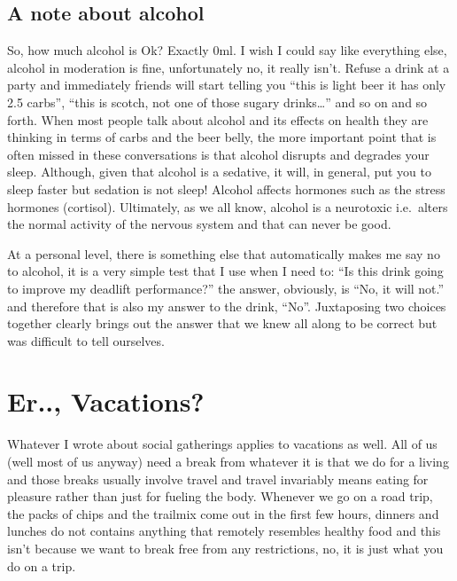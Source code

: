 \documentclass[
  oneside]{book}
\begin{document}
\hypertarget{a-note-about-alcohol}{%
\subsection{A note about alcohol}\label{a-note-about-alcohol}}

So, how much alcohol is Ok? Exactly 0ml. I wish I could say like everything else, alcohol in moderation is fine, unfortunately no, it really isn't. Refuse a drink at a party and immediately friends will start telling you ``this is light beer it has only 2.5 carbs'', ``this is scotch, not one of those sugary drinks\ldots{}'' and so on and so forth. When most people talk about alcohol and its effects on health they are thinking in terms of carbs and the beer belly, the more important point that is often missed in these conversations is that alcohol disrupts and degrades your sleep. Although, given that alcohol is a sedative, it will, in general, put you to sleep faster but sedation is not sleep! Alcohol affects hormones such as the stress hormones (cortisol). Ultimately, as we all know, alcohol is a neurotoxic i.e.~alters the normal activity of the nervous system and that can never be good.

At a personal level, there is something else that automatically makes me say no to alcohol, it is a very simple test that I use when I need to: ``Is this drink going to improve my deadlift performance?'' the answer, obviously, is ``No, it will not.'' and therefore that is also my answer to the drink, ``No''. Juxtaposing two choices together clearly brings out the answer that we knew all along to be correct but was difficult to tell ourselves.

\hypertarget{er..-vacations}{%
\section{Er.., Vacations?}\label{er..-vacations}}

Whatever I wrote about social gatherings applies to vacations as well. All of us (well most of us anyway) need a break from whatever it is that we do for a living and those breaks usually involve travel and travel invariably means eating for pleasure rather than just for fueling the body. Whenever we go on a road trip, the packs of chips and the trailmix come out in the first few hours, dinners and lunches do not contains anything that remotely resembles healthy food and this isn't because we want to break free from any restrictions, no, it is just what you do on a trip.
\end{document}
